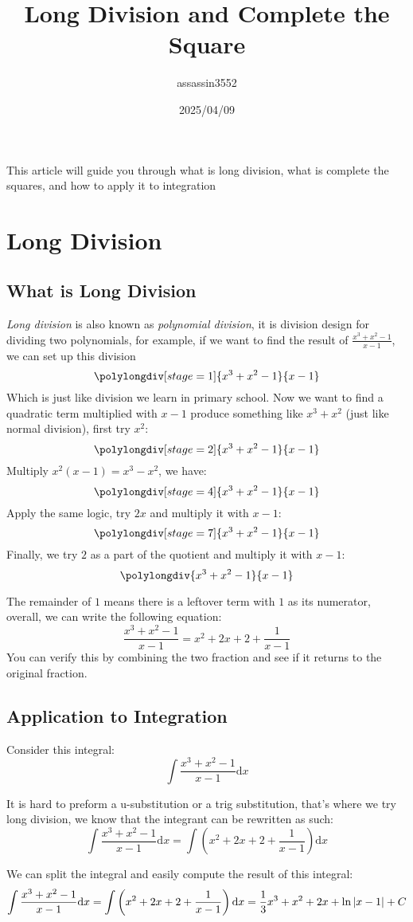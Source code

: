 \documentclass{article}
\title{Long Division and Complete the Square}
\author{assassin3552}
\date{2025/04/09}
\numberwithin{equation}{section}
\begin{document}
\maketitle
This article will guide you through what is long division, what is complete the squares, and how to apply it to integration
\section{Long Division}
\subsection{What is Long Division}
\emph{Long division} is also known as \emph{polynomial division}, it is division design for dividing two polynomials, for example, 
if we want to find the result of $\displaystyle \frac{x^3+x^2-1}{x-1}$, 
we can set up this division
\[
    \polylongdiv[stage=1]{x^3+x^2-1}{x-1}
\]
Which is just like division we learn in primary school. Now we want to find a quadratic term multiplied with $x-1$ produce something
like $x^3 + x^2$ (just like normal division), first try $x^2$:
\[
    \polylongdiv[stage=2]{x^3+x^2-1}{x-1}
\]
Multiply $x^2(x-1) = x^3 -x^2$, we have:
\[
    \polylongdiv[stage=4]{x^3+x^2-1}{x-1}
\]
Apply the same logic, try $2x$ and multiply it with $x-1$:
\[
    \polylongdiv[stage=7]{x^3+x^2-1}{x-1}
\]
Finally, we try $2$ as a part of the quotient and multiply it with $x-1$:
\[
    \polylongdiv{x^3+x^2-1}{x-1}
\]

The remainder of $1$ means there is a leftover term with $1$ as its numerator,
overall, we can write the following equation:
\[
\frac{x^3+x^2-1}{x-1} = x^2+2x+2 + \frac{1}{x-1}
\]
You can verify this by combining the two fraction and see if it returns 
to the original fraction.

\subsection{Application to Integration}
Consider this integral:
\[
\int \frac{x^3+x^2-1}{x-1} \mathrm{d}x
\]

It is hard to preform a u-substitution or a trig substitution, that's where we try long division, we know that the integrant can be rewritten as such:
\[
\int \frac{x^3+x^2-1}{x-1} \mathrm{d}x = \int \left(x^2+2x+2 + \frac{1}{x-1}\right) \mathrm{d}x
\]

We can split the integral and easily compute the result of this integral:
\[
\int \frac{x^3+x^2-1}{x-1} \mathrm{d}x = \int \left(x^2+2x+2 + \frac{1}{x-1}\right) \mathrm{d}x = \frac{1}{3}x^3 + x^2 + 2x + \ln\abs{x-1} + C
\]
\end{document}
